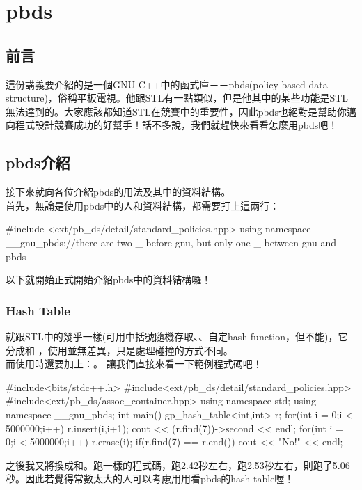 \documentclass[main.tex]{subfiles}
\begin{document}
\chapter{pbds}
\section{前言}
這份講義要介紹的是一個GNU C++中的函式庫－－pbds(policy-based data structure)，俗稱平板電視。他跟STL有一點類似，但是他其中的某些功能是STL無法達到的。大家應該都知道STL在競賽中的重要性，因此pbds也絕對是幫助你邁向程式設計競賽成功的好幫手！話不多說，我們就趕快來看看怎麼用pbds吧！
\section{pbds介紹}
接下來就向各位介紹pbds的用法及其中的資料結構。\\
首先，無論是使用pbds中的人和資料結構，都需要打上這兩行：\\
\begin{C++}
#include <ext/pb_ds/detail/standard_policies.hpp>
using namespace __gnu_pbds;//there are two _ before gnu, but only one _ between gnu and pbds
\end{C++}

以下就開始正式開始介紹pbds中的資料結構囉！
\subsection{Hash Table}
就跟STL中的幾乎一樣(可用中括號隨機存取、、自定hash function，但不能)，它分成和 ，使用並無差異，只是處理碰撞的方式不同。\\
而使用時還要加上：。
讓我們直接來看一下範例程式碼吧！\\
\begin{C++}
#include<bits/stdc++.h>
#include<ext/pb_ds/detail/standard_policies.hpp>
#include<ext/pb_ds/assoc_container.hpp>
using namespace std;
using namespace __gnu_pbds;
int main()
{
  gp_hash_table<int,int> r;
  for(int i = 0;i < 5000000;i++)
  {
    r.insert({i,i+1});
  }
  cout << (r.find(7))->second << endl;
  for(int i = 0;i < 5000000;i++)
  {
    r.erase(i);
  }
  if(r.find(7) == r.end())
  {
    cout << "No!" << endl;
  }
}
\end{C++}

之後我又將換成和。跑一樣的程式碼，跑2.42秒左右，跑2.53秒左右，則跑了5.06秒。因此若覺得常數太大的人可以考慮用用看pbds的hash table喔！
\end{document}
